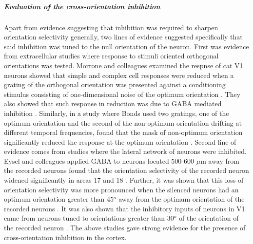 \subparagraph{Evaluation of the cross-orientation inhibition}

Apart from evidence suggesting that inhibition was required to sharpen orientation selectivity generally, two lines of evidence suggested specifically that said inhibition was tuned to the null orientation of the neuron. First was evidence from extracellular studies where response to stimuli oriented orthogonal orientations was tested. Morrone and colleagues examined the respnse of cat V1 neurons showed that simple and complex cell responses were reduced when a grating of the orthogonal orientation was presented against a conditioning stimulus consisting of one-dimensional noise of the optimum orientation \cite{Morrone1982}. They also showed that such response in reduction was due to GABA mediated inhibition \cite{Morrone1987}. Similarly, in a study where Bonds used two gratings, one of the optimum orientation and the second of the non-optimum orientation drifting at different temporal frequencies, found that the mask of non-optimum orientation significantly reduced the response at the optimum orientation \cite{Bonds1989}. Second line of evidence comes from studies where the lateral network of neurons were inhibited. Eysel and colleagues applied GABA to neurons located 500-600 $\mu$m away from the recorded neurons found that the orientation selectivity of the recorded neuron widened significantly in areas 17 and 18 \cite{Worgotter1988, Eysel1990, Crook1992}. Further, it was shown that this loss of orientation selectivity was more pronounced when the silenced neurons had an optimum orientation greater than 45$^o$ away from the optimum orientation of the recorded neurons \cite{Crook1992, Crook1997}. It was also shown that the inhibitory inputs of neurons in V1 came from neurons tuned to orientations greater than 30$^o$ of the orientation of the recorded neuron \cite{Kisvarday1997}. The above studies gave strong evidence for the presence of cross-orientation inhibition in the cortex.

